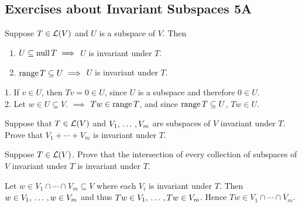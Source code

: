 \subsection*{Exercises about Invariant Subspaces 5A}

\begin{xrcs}
  Suppose $T \in \mathcal{L}(V)$ and $U$ is a subspace of $V$. Then
  \begin{enumerate}
    \item $U \subseteq \operatorname{null} T \implies$ $U$ is invariant under $T$.
    \item $\operatorname{range} T \subseteq U \implies$ $U$ is invariant under $T$.
  \end{enumerate}

  \begin{prf}
    { }1. { }If $v \in U$, then $Tv = 0 \in U$, since $U$ is a subspace and therefore $0 \in U$. \\
    2. { }Let $w \in U\subseteq V$. $\implies$ $Tw \in \operatorname{range} T$, and since $\operatorname{range} T \subseteq U$, $Tw \in U$.
  \end{prf}

\end{xrcs}


\begin{xrcs}
  Suppose that $T \in \mathcal{L} (V)$ and $V_1, {\, \ldots \,\,}, V_m$ are subspaces of $V$ invariant under $T$. \\
  Prove that $V_1 + \cdots + V_m$ is invariant under $T$.

\end{xrcs}


\begin{xrcs}
  Suppose $T \in \mathcal{L}(V)$. Prove that the intersection of every collection of subspaces of $V$ invariant under $T$ is invariant under $T$.

  \begin{prf}
    Let $w \in V_1 \cap \cdots \cap V_m \subseteq V$ where each $V_i$ is invariant under $T$. Then $w \in V_1, {\, \ldots \,\,}, w \in V_m$ and thus $Tw \in V_1, {\, \ldots \,\,}, Tw \in V_m$. Hence $Tw \in V_1 \cap \cdots \cap V_m$.
  \end{prf}
\end{xrcs}
